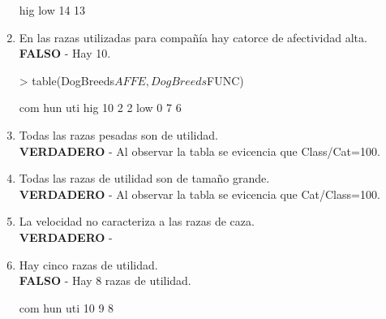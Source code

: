 \documentclass[letterpaper, 12pt]{article}
\begin{document}
\begin{enumerate}
\begin{Schunk}
\begin{Soutput}
hig low 
 14  13 
\end{Soutput}
\end{Schunk}
\item En las razas utilizadas para compañía hay catorce de afectividad alta.\\
\textbf{FALSO} - Hay 10.
\begin{Schunk}
\begin{Sinput}
> table(DogBreeds$AFFE, DogBreeds$FUNC)
\end{Sinput}
\begin{Soutput}
      com hun uti
  hig  10   2   2
  low   0   7   6
\end{Soutput}
\end{Schunk}
\item Todas las razas pesadas son de utilidad.\\
\textbf{VERDADERO} - Al observar la tabla se evicencia que Class/Cat=100.
\item Todas las razas de utilidad son de tamaño grande.\\
\textbf{VERDADERO} - Al observar la tabla se evicencia que Cat/Class=100.
\item La velocidad no caracteriza a las razas de caza.\\
\textbf{VERDADERO} - 
\item Hay cinco razas de utilidad.\\
\textbf{FALSO} - Hay 8 razas de utilidad.
\begin{Schunk}
\begin{Soutput}
com hun uti 
 10   9   8 
\end{Soutput}
\end{Schunk}
\end{enumerate}
\end{document}
